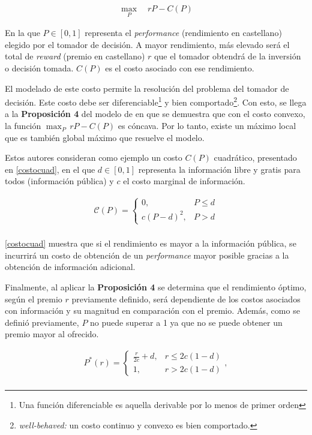 \begin{align}
    \max_{P}\quad rP-C(P)
\end{align}


En la que $P \in [0,1]$ representa el \textit{performance} (rendimiento en castellano) elegido por el tomador de decisión. A mayor rendimiento, más elevado será el total de \textit{reward} (premio en castellano) $r$ que el tomador obtendrá de la inversión o decisión tomada. $C(P)$ es el costo asociado con ese rendimiento. 
\vspace{2.5mm}

El modelado de este costo permite la resolución del problema del tomador de decisión. Este costo debe ser diferenciable\footnote{Una función diferenciable es aquella derivable por lo menos de primer orden} y bien comportado\footnote{\textit{well-behaved:} un costo continuo y convexo es bien comportado. }. Con esto, se llega a la \textbf{Proposición 4} del modelo de  en que se demuestra que con el costo convexo, la función $\max_{P}\, rP-C(P)$ es cóncava. Por lo tanto, existe un máximo local que es también global máximo que resuelve el modelo.
\vspace{2.5mm}

 Estos autores consideran como ejemplo un costo $C(P)$ cuadrático, presentado en \ref{costocuad}, en el que $d \in [0,1]$ representa la información libre y gratis para todos (información pública) y $c$ el costo marginal de información. 

\begin{equation}
\begin{array}{rrclcl}
    {\mathcal{C}}(P)=\begin{cases}0,&P\leq d\\c(P-d)^2,&P>d\end{cases}\label{costocuad}\\
\end{array}
\end{equation}
\vspace{2.5mm}

\ref{costocuad} muestra que si el rendimiento es mayor a la información pública, se incurrirá un costo de obtención de un \textit{performance} mayor posible gracias a la obtención de información adicional.
\vspace{2.5mm}

Finalmente, al aplicar la \textbf{Proposición 4} se determina que el rendimiento óptimo, según el premio $r$ previamente definido, será dependiente de los costos asociados con información y su magnitud en comparación con el premio. Además, como se definió previamente, $P$ no puede superar a 1 ya que no se puede obtener un premio mayor al ofrecido.

\begin{equation}
\begin{array}{rrclcl}
    P^*(r) = \begin{cases}\frac{r}{2c}+d,&r\leq 2c(1-d)\\1,&r>2c(1-d)\end{cases}, \label{perforopt}\\
\end{array}
\end{equation}





